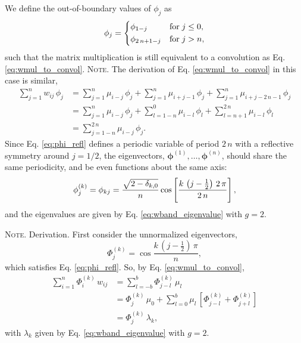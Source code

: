 \documentclass[reprint, superscriptaddress, floatfix]{revtex4-1}
\newcommand{\note}[1]{{\color{DarkGreen}\footnotesize \textsc{Note.} #1}}
\begin{document}
We define the out-of-boundary values
of $\phi_j$ as
%
\begin{equation}
  \phi_j
  =
  \begin{dcases}
    \phi_{ 1 - j }           & \mathrm{for \;} j \le 0, \\
    \phi_{ 2 \, n + 1 - j }  & \mathrm{for \;} j > n,
  \end{dcases}
\label{eq:phi_refl}
\end{equation}
%
such that the matrix multiplication is still equivalent to
a convolution as Eq. \eqref{eq:wmul_to_convol}.
%
\note{The derivation of Eq. \eqref{eq:wmul_to_convol}
  in this case is similar,
  $$
  \begin{aligned}
    \sum_{j = 1}^n w_{ij} \, \phi_j
    &=
    \sum_{j = 1}^n
      \mu_{i - j} \, \phi_j
    +
    \sum_{j = 1}^n
      \mu_{i + j - 1} \, \phi_j
    +
    \sum_{j = 1}^n
      \mu_{i + j - 2 \, n - 1} \, \phi_j
    \\
    &=
    \sum_{j = 1}^n
      \mu_{i - j} \, \phi_j
    +
    \sum_{l = 1 - n}^0
      \mu_{i - l} \, \phi_l
    +
    \sum_{l = n + 1}^{ 2 \, n }
      \mu_{i - l} \, \phi_l
    \\
    &=
    \sum_{j = 1 - n}^{ 2 \, n}
      \mu_{i - j} \, \phi_j.
  \end{aligned}
  $$
}%
%
Since Eq. \eqref{eq:phi_refl}
defines a periodic variable of period $2 \, n$
with a reflective symmetry around $j = 1/2$,
the eigenvectors,
$\pmb\phi^{(1)}, \dots, \pmb\phi^{(n)}$,
should share the same periodicity,
and be even functions about the same axis:
%
\begin{equation}
  \phi^{(k)}_j
  =
  \phi_{k j}
  =
  \frac{ \sqrt{ 2 - \delta_{k, 0} } }
       {             n              }
  \cos \left[
       \frac{ k \, \left( j - \frac 1 2 \right) \, 2 \, \pi}
            {             2 \, n                           }
       \right]
  ,
\notag
\end{equation}
%
and the eigenvalues are given by
  Eq. \eqref{eq:wband_eigenvalue}
  with $g = 2$.

\note{Derivation.
  First consider the unnormalized eigenvectors,
  $$
  \Phi^{(k)}_j
  =
  \cos \frac{ k \, \left( j - \frac 1 2 \right) \, \pi }{n},
  $$
  which satisfies Eq. \eqref{eq:phi_refl}.
  So, by Eq. \eqref{eq:wmul_to_convol},
  $$
  \begin{aligned}
  \sum_{i = 1}^n
    \Phi^{(k)}_i \, w_{ij}
  &=
  \sum_{l = -b}^b
    \Phi^{(k)}_{j - l} \, \mu_l
  \\
  &=
    \Phi^{(k)}_j \, \mu_0
  + \sum_{l=0}^{b}
    \mu_l \,
    \left[
      \Phi^{(k)}_{j-l}
      +
      \Phi^{(k)}_{j+l}
    \right]
  \\
  &= \Phi^{(k)}_j \, \lambda_k,
  \end{aligned}
  $$
  with $\lambda_k$ given by Eq. \eqref{eq:wband_eigenvalue}
  with $g = 2$.
}%
%
\end{document}
